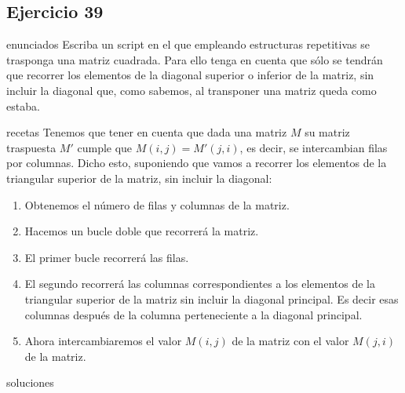 \subsection{Ejercicio 39}
\def\parte{enunciados}
\ifx\capitulo\parte
Escriba un script en el que empleando estructuras repetitivas se trasponga una matriz cuadrada. Para ello tenga en cuenta que sólo se tendrán que recorrer los elementos de la diagonal superior o inferior de la matriz, sin incluir la diagonal que, como sabemos, al transponer una matriz queda como estaba.
\fi

\def\parte{recetas}
\ifx\capitulo\parte
Tenemos que tener en cuenta que dada una matriz $M$ su matriz traspuesta $M'$ cumple que $M(i,j) = M'(j,i)$, es decir, se intercambian filas por columnas. Dicho esto, suponiendo que vamos a recorrer los elementos de la triangular superior de la matriz, sin incluir la diagonal:

\begin{enumerate}
\item Obtenemos el número de filas y columnas de la matriz.
\item Hacemos un bucle  doble que recorrerá la matriz.
\item El primer bucle recorrerá las filas.
\item El segundo recorrerá las columnas correspondientes a los elementos de la triangular superior de la matriz sin incluir la diagonal principal. Es decir esas columnas después de la columna perteneciente a la diagonal principal.
\item Ahora intercambiaremos el valor $M(i,j)$ de la matriz con el valor $M(j,i)$ de la matriz.
\end{enumerate}
\fi

\def\parte{soluciones}
\ifx\capitulo\parte

\fi

